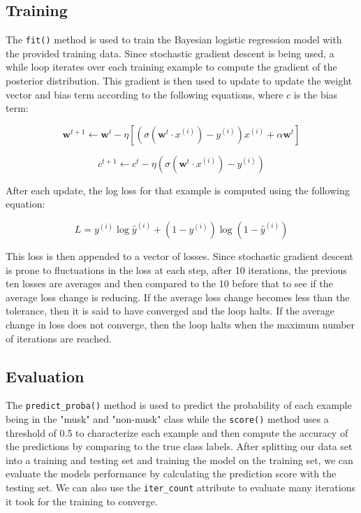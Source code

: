 \documentclass[12pt]{article}
\begin{document}
\subsection{Training}

The \texttt{fit()} method is used to train the Bayesian logistic regression model with the provided training data. Since stochastic gradient descent is being used, a while loop iterates over each training example to compute the gradient of the posterior distribution. This gradient is then used to update to update the weight vector and bias term according to the following equations, where $c$ is the bias term:

\begin{equation}
\mathbf{w}^{t+1} \leftarrow \mathbf{w}^{t} - \eta \left[ \left(\sigma(\mathbf{w}^t \cdot x^{(i)}) - y^{(i)}\right) x^{(i)} + \alpha \mathbf{w}^{t} \right]
\end{equation}

\begin{equation}
c^{t+1} \leftarrow c^{t} - \eta (\sigma(\mathbf{w}^t \cdot x^{(i)}) - y^{(i)})
\end{equation}

After each update, the log loss for that example is computed using the following equation:

\begin{equation}
L = y^{(i)} \log \hat{y}^{(i)}+ (1-y^{(i)})\log(1-\hat{y}^{(i)})
\end{equation}

This loss is then appended to a vector of losses. Since stochastic gradient descent is prone to fluctuations in the loss at each step, after 10 iterations, the previous ten losses are averages and then compared to the 10 before that to see if the average loss change is reducing. If the average loss change becomes less than the tolerance, then it is said to have converged and the loop halts. If the average change in loss does not converge, then the loop halts when the maximum number of iterations are reached.

\subsection{Evaluation}

The \texttt{predict\_proba()} method is used to predict the probability of each example being in the "musk" and "non-musk" class while the \texttt{score()} method uses a threshold of 0.5 to characterize each example and then compute the accuracy of the predictions by comparing to the true class labels. After splitting our data set into a training and testing set and training the model on the training set, we can evaluate the models performance by calculating the prediction score with the testing set. We can also use the \texttt{iter\_count} attribute to evaluate many iterations it took for the training to converge.
\end{document}
